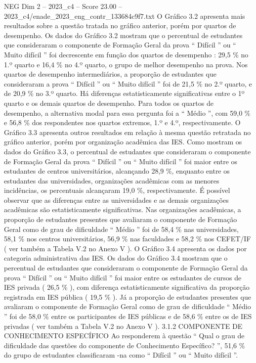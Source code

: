 \begin{textsample}{NEG Dim 2 – 2023\_c4 – Score 23.00 – 2023\_c4/enade\_2023\_eng\_contr\_133684c9f7.txt}
O Gráfico 3.2 apresenta mais resultados sobre a questão tratada no gráfico anterior, porém por quartos de desempenho.
Os dados do Gráfico 3.2 mostram que o percentual de estudantes que consideraram o componente de Formação Geral da prova “ Difícil ” ou “ Muito difícil ” foi decrescente em função dos quartos de desempenho : 29,5 \% no 1.º quarto e 16,4 \% no 4.º quarto, o grupo de melhor desempenho na prova.
Nos quartos de desempenho intermediários, a proporção de estudantes que consideraram a prova “ Difícil ” ou “ Muito difícil ” foi de 21,5 \% no 2.º quarto, e de 20,9 \% no 3.º quarto.
Há diferenças estatisticamente significativas entre o 1º quarto e os demais quartos de desempenho.
Para todos os quartos de desempenho, a alternativa modal para essa pergunta foi a “ Médio ”, com 59,0 \% e 56,8 \% dos respondentes nos quartos extremos, 1.º e 4.º, respectivamente.
O Gráfico 3.3 apresenta outros resultados em relação à mesma questão retratada no gráfico anterior, porém por organização acadêmica das IES.
Como mostram os dados do Gráfico 3.3, o percentual de estudantes que consideraram o componente de Formação Geral da prova “ Difícil ” ou “ Muito difícil ” foi maior entre os estudantes de centros universitários, alcançando 28,9 \%, enquanto entre os estudantes das universidades, organizações acadêmicas com as menores incidências, os percentuais alcançaram 19,0 \%, respectivamente.
É possível observar que as diferenças entre as universidades e as demais organizações acadêmicas são estatisticamente significativas.
Nas organizações acadêmicas, a proporção de estudantes presentes que avaliaram o componente de Formação Geral como de grau de dificuldade “ Médio ” foi de 58,4 \% nas universidades, 58,1 \% nos centros universitários, 56,9 \% nas faculdades e 58,2 \% nos CEFET/IF ( ver também a Tabela V.2 no Anexo V ).
O Gráfico 3.4 apresenta os dados por categoria administrativa das IES.
Os dados do Gráfico 3.4 mostram que o percentual de estudantes que consideraram o componente de Formação Geral da prova “ Difícil ” ou “ Muito difícil ” foi maior entre os estudantes de cursos de IES privada ( 26,5 \% ), com diferença estatisticamente significativa da proporção registrada em IES pública ( 19,5 \% ).
Já a proporção de estudantes presentes que avaliaram o componente de Formação Geral como de grau de dificuldade “ Médio ” foi de 58,0 \% entre os participantes de IES públicas e de 58,6 \% entre os de IES privadas ( ver também a Tabela V.2 no Anexo V ). 3.1.2 COMPONENTE DE CONHECIMENTO ESPECÍFICO Ao responderem à questão “ Qual o grau de dificuldade das questões do componente de Conhecimento Específico? ”, 51,6 \% do grupo de estudantes classificaram -na como “ Difícil ” ou “ Muito difícil ”.

\end{textsample}
